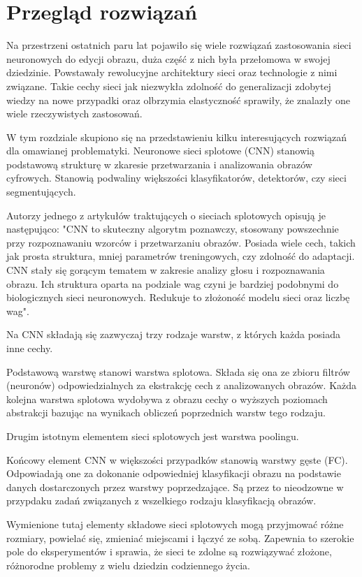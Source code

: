 \section{Przegląd rozwiązań}
  Na przestrzeni ostatnich paru lat pojawiło się wiele rozwiązań zastosowania
  sieci neuronowych do edycji obrazu, duża część z nich była przełomowa w
  swojej dziedzinie. Powstawały rewolucyjne architektury sieci oraz technologie
  z nimi związane. Takie cechy sieci jak niezwykła zdolność do generalizacji zdobytej wiedzy na nowe przypadki oraz olbrzymia elastyczność sprawiły, że
  znalazły one wiele rzeczywistych zastosowań.

  W tym rozdziale skupiono się na przedstawieniu kilku interesujących rozwiązań
  dla omawianej problematyki.
   Neuronowe sieci splotowe (CNN) stanowią podstawową strukturę w zkaresie przetwarzania i analizowania obrazów cyfrowych. Stanowią podwaliny większości klasyfikatorów, detektorów, czy sieci segmentujących.

   Autorzy jednego z artykułów traktujących o sieciach splotowych \cite{cnn} opisują je następująco: "CNN to skuteczny algorytm poznawczy, stosowany powszechnie przy rozpoznawaniu wzorców i przetwarzaniu obrazów. Posiada wiele cech, takich jak prosta struktura, mniej parametrów treningowych, czy zdolność do adaptacji. CNN stały się gorącym tematem w zakresie analizy głosu i rozpoznawania obrazu. Ich struktura oparta na podziale wag czyni je bardziej podobnymi do biologicznych sieci neuronowych. Redukuje to złożoność modelu sieci oraz liczbę wag".

   Na CNN składają się zazwyczaj trzy rodzaje warstw, z których każda posiada inne cechy.

   Podstawową warstwę stanowi warstwa splotowa. Składa się ona ze zbioru filtrów (neuronów) odpowiedzialnych za ekstrakcję cech z analizowanych obrazów. Każda kolejna warstwa splotowa wydobywa z obrazu cechy o wyższych poziomach abstrakcji bazując na wynikach obliczeń poprzednich warstw tego rodzaju.

   Drugim istotnym elementem sieci splotowych jest warstwa poolingu. %

   Końcowy element CNN w większości przypadków stanowią warstwy gęste (FC). Odpowiadają one za dokonanie odpowiedniej klasyfikacji obrazu na podstawie danych dostarczonych przez warstwy poprzedzające. Są przez to nieodzowne w przypdaku zadań związanych z wszelkiego rodzaju klasyfikacją obrazów.

   Wymienione tutaj elementy składowe sieci splotowych mogą przyjmować różne rozmiary, powielać się, zmieniać miejscami i łączyć ze sobą. Zapewnia to szerokie pole do eksperymentów i sprawia, że sieci te zdolne są rozwiązywać złożone, różnorodne problemy z wielu dziedzin codziennego życia.

